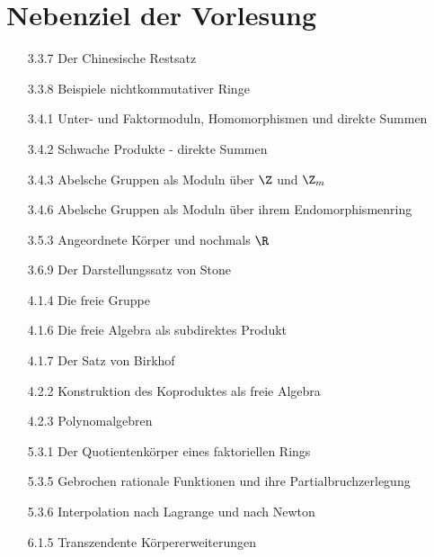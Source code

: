 \section{Nebenziel der Vorlesung}

\begin{itemize}

  \item
  [3.3.7]
  Der Chinesische Restsatz

  \item
  [3.3.8]
  Beispiele nichtkommutativer Ringe

  \item
  [3.4.1]
  Unter- und Faktormoduln, Homomorphismen und direkte Summen

  \item
  [3.4.2]
  Schwache Produkte - direkte Summen

  \item
  [3.4.3]
  Abelsche Gruppen als Moduln über $\Z$ und $\Z_m$

  \item
  [3.4.6]
  Abelsche Gruppen als Moduln über ihrem Endomorphismenring

  \item
  [3.5.3]
  Angeordnete Körper und nochmals $\R$

  \item
  [3.6.9]
  Der Darstellungssatz von Stone

  \item
  [4.1.4]
  Die freie Gruppe

  \item
  [4.1.6]
  Die freie Algebra als subdirektes Produkt

  \item
  [4.1.7]
  Der Satz von Birkhof

  \item
  [4.2.2]
  Konstruktion des Koproduktes als freie Algebra

  \item
  [4.2.3]
  Polynomalgebren

  \item
  [5.3.1]
  Der Quotientenkörper eines faktoriellen Rings

  \item
  [5.3.5]
  Gebrochen rationale Funktionen und ihre Partialbruchzerlegung

  \item
  [5.3.6]
  Interpolation nach Lagrange und nach Newton

  \item
  [6.1.5]
  Transzendente Körpererweiterungen


\end{itemize}
